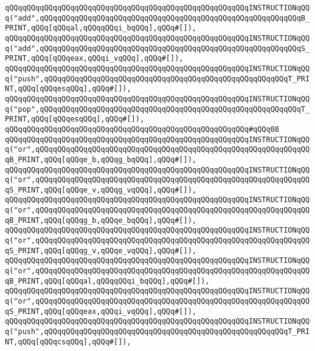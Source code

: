 \verb|qQQqqQQqqQQqqQQqqQQqqQQqqQQqqQQqqQQqqQQqqQQqqQQqqQQqqQQqINSTRUCTIONqQQq("add",qQQqqQQqqQQqqQQqqQQqqQQqqQQqqQQqqQQqqQQqqQQqqQQqqQQqqQQqqQQqB_PRINT,qQQq[qQQqal,qQQqqQQqi_bqQQq],qQQq#[]),|\newline
\verb|qQQqqQQqqQQqqQQqqQQqqQQqqQQqqQQqqQQqqQQqqQQqqQQqqQQqqQQqINSTRUCTIONqQQq("add",qQQqqQQqqQQqqQQqqQQqqQQqqQQqqQQqqQQqqQQqqQQqqQQqqQQqqQQqqQQqS_PRINT,qQQq[qQQqeax,qQQqi_vqQQq],qQQq#[]),|\newline
\verb|qQQqqQQqqQQqqQQqqQQqqQQqqQQqqQQqqQQqqQQqqQQqqQQqqQQqqQQqINSTRUCTIONqQQq("push",qQQqqQQqqQQqqQQqqQQqqQQqqQQqqQQqqQQqqQQqqQQqqQQqqQQqqQQqT_PRINT,qQQq[qQQqesqQQq],qQQq#[]),|\newline
\verb|qQQqqQQqqQQqqQQqqQQqqQQqqQQqqQQqqQQqqQQqqQQqqQQqqQQqqQQqINSTRUCTIONqQQq("pop",qQQqqQQqqQQqqQQqqQQqqQQqqQQqqQQqqQQqqQQqqQQqqQQqqQQqqQQqqQQqT_PRINT,qQQq[qQQqesqQQq],qQQq#[]),|\newline
\verb|qQQqqQQqqQQqqQQqqQQqqQQqqQQqqQQqqQQqqQQqqQQqqQQqqQQqqQQq#qQQq08|\newline
\verb|qQQqqQQqqQQqqQQqqQQqqQQqqQQqqQQqqQQqqQQqqQQqqQQqqQQqqQQqINSTRUCTIONqQQq("or",qQQqqQQqqQQqqQQqqQQqqQQqqQQqqQQqqQQqqQQqqQQqqQQqqQQqqQQqqQQqqQQqB_PRINT,qQQq[qQQqe_b,qQQqg_bqQQq],qQQq#[]),|\newline
\verb|qQQqqQQqqQQqqQQqqQQqqQQqqQQqqQQqqQQqqQQqqQQqqQQqqQQqqQQqINSTRUCTIONqQQq("or",qQQqqQQqqQQqqQQqqQQqqQQqqQQqqQQqqQQqqQQqqQQqqQQqqQQqqQQqqQQqqQQqS_PRINT,qQQq[qQQqe_v,qQQqg_vqQQq],qQQq#[]),|\newline
\verb|qQQqqQQqqQQqqQQqqQQqqQQqqQQqqQQqqQQqqQQqqQQqqQQqqQQqqQQqINSTRUCTIONqQQq("or",qQQqqQQqqQQqqQQqqQQqqQQqqQQqqQQqqQQqqQQqqQQqqQQqqQQqqQQqqQQqqQQqB_PRINT,qQQq[qQQqg_b,qQQqe_bqQQq],qQQq#[]),|\newline
\verb|qQQqqQQqqQQqqQQqqQQqqQQqqQQqqQQqqQQqqQQqqQQqqQQqqQQqqQQqINSTRUCTIONqQQq("or",qQQqqQQqqQQqqQQqqQQqqQQqqQQqqQQqqQQqqQQqqQQqqQQqqQQqqQQqqQQqqQQqS_PRINT,qQQq[qQQqg_v,qQQqe_vqQQq],qQQq#[]),|\newline
\verb|qQQqqQQqqQQqqQQqqQQqqQQqqQQqqQQqqQQqqQQqqQQqqQQqqQQqqQQqINSTRUCTIONqQQq("or",qQQqqQQqqQQqqQQqqQQqqQQqqQQqqQQqqQQqqQQqqQQqqQQqqQQqqQQqqQQqqQQqB_PRINT,qQQq[qQQqal,qQQqqQQqi_bqQQq],qQQq#[]),|\newline
\verb|qQQqqQQqqQQqqQQqqQQqqQQqqQQqqQQqqQQqqQQqqQQqqQQqqQQqqQQqINSTRUCTIONqQQq("or",qQQqqQQqqQQqqQQqqQQqqQQqqQQqqQQqqQQqqQQqqQQqqQQqqQQqqQQqqQQqqQQqS_PRINT,qQQq[qQQqeax,qQQqi_vqQQq],qQQq#[]),|\newline
\verb|qQQqqQQqqQQqqQQqqQQqqQQqqQQqqQQqqQQqqQQqqQQqqQQqqQQqqQQqINSTRUCTIONqQQq("push",qQQqqQQqqQQqqQQqqQQqqQQqqQQqqQQqqQQqqQQqqQQqqQQqqQQqqQQqT_PRINT,qQQq[qQQqcsqQQq],qQQq#[]),|\newline
